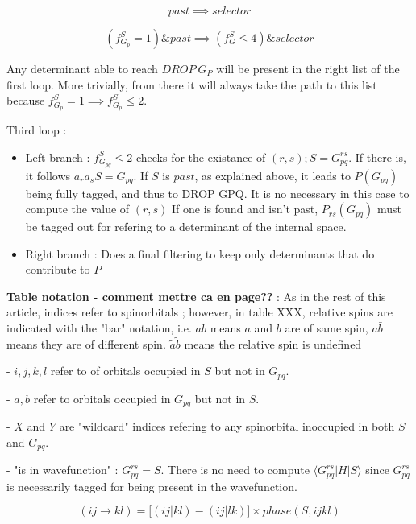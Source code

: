\documentclass[./thesis.tex]{subfiles}
\begin{document}
\begin{equation}
past \implies selector
\end{equation}


\begin{equation}
(f^S_{G_{p}} = 1) \& past \implies (f^S_G \leq 4) \& selector
\end{equation}



Any determinant able to reach $DROP\ G_P$ will be present in the right list of the first loop. More trivially, from there it will always take the path to this list because $f^S_{G_{p}} = 1 \implies f^S_{G_{p}} \leq 2$.

Third loop :
\begin{itemize}

\item
Left branch : $f_{G_{pq}}^S \leq 2$ checks for the existance of $(r,s) ;S=G_{pq}^{rs}$. 
If there is, it follows $a_r a_s S = G_{pq}$. If $S$ is $past$, as explained above, it leads to $P(G_{pq})$ being fully tagged, and thus to DROP GPQ. It is no necessary in this case to compute the value of $(r,s)$
If one is found and isn't past, $P_{rs}(G_{pq})$ must be tagged out for refering to a determinant of the internal space.
\item
Right branch :
Does a final filtering to keep only determinants that do contribute to $P$
\end{itemize}



\textbf{Table notation - comment mettre ca en page??} : As in the rest of this article, indices refer to spinorbitals ; however, in table XXX, relative spins are indicated with the "bar" notation, i.e. $ab$ means $a$ and $b$ are of same spin, $a\bar b$ means they are of different spin. $\tilde a \tilde b$ means the relative spin is undefined

- $i,j,k,l$ refer to of orbitals occupied in $S$ but not in $G_{pq}$.

- $a,b$ refer to orbitals occupied in $G_{pq}$ but not in $S$.

- $X$ and $Y$ are "wildcard" indices refering to any spinorbital inoccupied in both $S$ and $G_{pq}$.

- "is in wavefunction" : $G_{pq}^{rs} = S$. There is no need to compute $\langle G_{pq}^{rs}|H|S \rangle$ since $G_{pq}^{rs}$ is necessarily tagged for being present in the wavefunction.



\begin{equation}
(ij \rightarrow kl) = \big [(ij|kl) - (ij|lk) \big ] \times phase(S,ijkl)
\end{equation}
\end{document}

